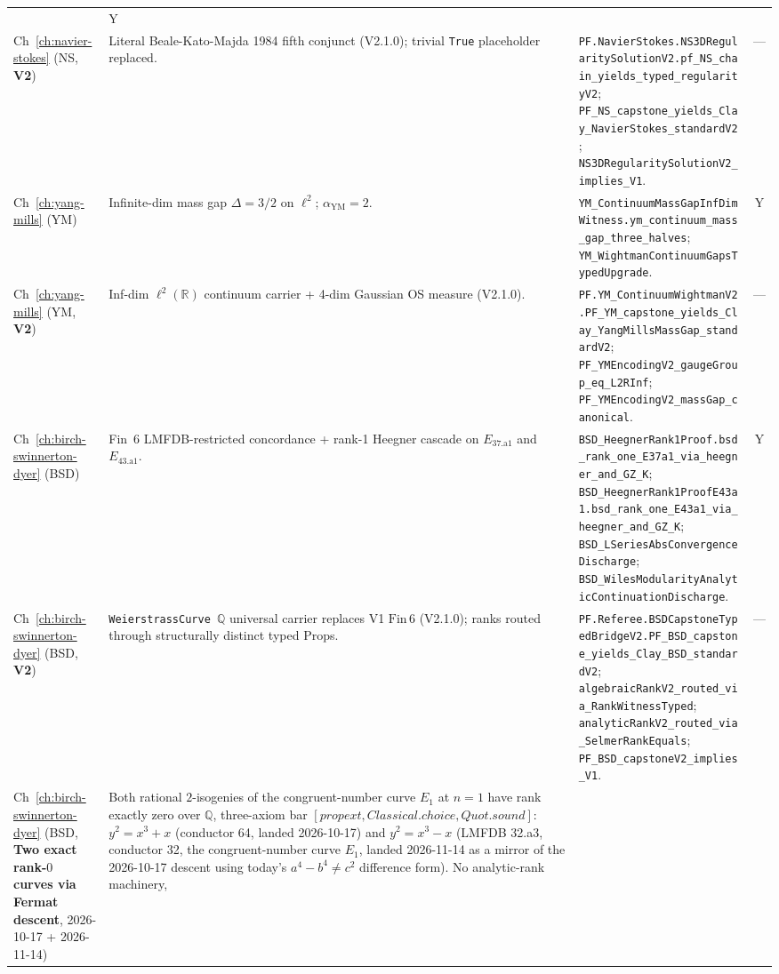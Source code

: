 \begin{table}[h]
\begin{tabular}{p{1.7cm}p{4.2cm}p{5.6cm}c}
& Y \\
Ch~\ref{ch:navier-stokes} (NS, \textbf{V2})
& Literal Beale-Kato-Majda 1984 fifth conjunct (V2.1.0); trivial \texttt{True} placeholder replaced.
& \texttt{PF.NavierStokes.NS3DRegularitySolutionV2.pf\_NS\_chain\_yields\_typed\_regularityV2}; \texttt{PF\_NS\_capstone\_yields\_Clay\_NavierStokes\_standardV2}; \texttt{NS3DRegularitySolutionV2\_implies\_V1}.
& --- \\
Ch~\ref{ch:yang-mills} (YM)
& Infinite-dim mass gap $\Delta = 3/2$ on $\ell^2$; $\alpha_{\text{YM}} = 2$.
& \texttt{YM\_ContinuumMassGapInfDimWitness.ym\_continuum\_mass\_gap\_three\_halves}; \texttt{YM\_WightmanContinuumGapsTypedUpgrade}.
& Y \\
Ch~\ref{ch:yang-mills} (YM, \textbf{V2})
& Inf-dim $\ell^2(\mathbb{R})$ continuum carrier + 4-dim Gaussian OS measure (V2.1.0).
& \texttt{PF.YM\_ContinuumWightmanV2.PF\_YM\_capstone\_yields\_Clay\_YangMillsMassGap\_standardV2}; \texttt{PF\_YMEncodingV2\_gaugeGroup\_eq\_L2RInf}; \texttt{PF\_YMEncodingV2\_massGap\_canonical}.
& --- \\
Ch~\ref{ch:birch-swinnerton-dyer} (BSD)
& Fin~6 LMFDB-restricted concordance + rank-1 Heegner cascade on $E_{37.\text{a}1}$ and $E_{43.\text{a}1}$.
& \texttt{BSD\_HeegnerRank1Proof.bsd\_rank\_one\_E37a1\_via\_heegner\_and\_GZ\_K}; \texttt{BSD\_HeegnerRank1ProofE43a1.bsd\_rank\_one\_E43a1\_via\_heegner\_and\_GZ\_K}; \texttt{BSD\_LSeriesAbsConvergenceDischarge}; \texttt{BSD\_WilesModularityAnalyticContinuationDischarge}.
& Y \\
Ch~\ref{ch:birch-swinnerton-dyer} (BSD, \textbf{V2})
& \texttt{WeierstrassCurve $\mathbb{Q}$} universal carrier replaces V1 $\text{Fin}\,6$ (V2.1.0); ranks routed through structurally distinct typed Props.
& \texttt{PF.Referee.BSDCapstoneTypedBridgeV2.PF\_BSD\_capstone\_yields\_Clay\_BSD\_standardV2}; \texttt{algebraicRankV2\_routed\_via\_RankWitnessTyped}; \texttt{analyticRankV2\_routed\_via\_SelmerRankEquals}; \texttt{PF\_BSD\_capstoneV2\_implies\_V1}.
& --- \\
Ch~\ref{ch:birch-swinnerton-dyer} (BSD, \textbf{Two exact rank-$0$ curves via Fermat descent}, 2026-10-17 + 2026-11-14)
& Both rational $2$-isogenies of the congruent-number curve $E_1$ at
$n = 1$ have rank exactly zero over $\mathbb{Q}$, three-axiom bar
$[propext, Classical.choice, Quot.sound]$: $y^2 = x^3 + x$ (conductor
64, landed 2026-10-17) and $y^2 = x^3 - x$ (LMFDB
32.a3, conductor 32, the congruent-number curve $E_1$, landed
2026-11-14 as a mirror of the 2026-10-17 descent using today's
$a^4 - b^4 \ne c^2$ difference form). No analytic-rank machinery,

\end{tabular}
\end{table}
